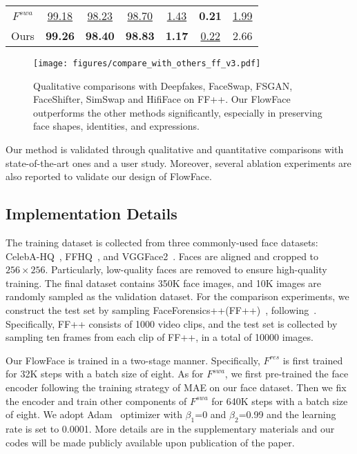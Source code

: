 \begin{table}[t]
{\begin{tabular}{c|ccc|c|c|c}
$F^{swa}$          & \underline{99.18}      & \underline{98.23}      & \underline{98.70} & \underline{1.43}                             & \textbf{0.21}                             & \underline{1.99}                             \\
Ours & \textbf{99.26}      & \textbf{98.40}      & \textbf{98.83} & \textbf{1.17}                             & \underline{0.22}                             & 2.66             
\end{tabular}
}
\end{table}

\begin{figure*}[t]
\centering
\texttt{[image: figures/compare\_with\_others\_ff\_v3.pdf]}
\caption{Qualitative comparisons with Deepfakes, FaceSwap, FSGAN, FaceShifter, SimSwap and HifiFace on FF++. Our FlowFace outperforms the other methods significantly, especially in preserving face shapes, identities, and expressions. 
}
\label{fig:FF_comparison}
\end{figure*}

Our method is validated through qualitative and quantitative comparisons with state-of-the-art ones and a user study. Moreover, several ablation experiments are also reported to validate our design of FlowFace.

\subsection{Implementation Details}
 The training dataset is collected from three commonly-used face datasets: CelebA-HQ~\cite{karras2017progressive}, FFHQ~\cite{karras2019style}, and VGGFace2~\cite{cao2018vggface2}. Faces are aligned and cropped to $256\times256$.
Particularly, low-quality faces are removed to ensure high-quality training. The final dataset contains 350K face images, and 10K images are randomly sampled as the validation dataset. For the comparison experiments, we construct the test set by sampling FaceForensics++(FF++)~\cite{roessler2019faceforensicspp}, following~\cite{li2019faceshifter}. Specifically, FF++ consists of 1000 video clips, and the test set is collected by sampling ten frames from each clip of FF++, in a total of 10000 images.  

 Our FlowFace is trained in a two-stage manner. Specifically, $F^{res}$ is first trained for 32K steps with a batch size of eight. As for $F^{swa}$, we first pre-trained the face encoder following the training strategy of MAE on our face dataset. Then we fix the encoder and train other components of $F^{swa}$ for 640K steps with a batch size of eight. 
We adopt Adam~\cite{kingma2014adam} optimizer with $\beta_1$=0 and $\beta_2$=0.99 and the learning rate is set to 0.0001. 
More details are in the supplementary materials and our codes will be made publicly available upon publication of the paper.

